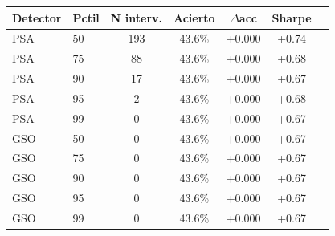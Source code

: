 \begin{tabular}{llccccc}
    \toprule
    Detector & Pctil & N interv. & Acierto & $\Delta$acc & Sharpe \\
    \midrule
        PSA & 50 & 193 & 43.6\% & +0.000 & +0.74 \\
        PSA & 75 & 88 & 43.6\% & +0.000 & +0.68 \\
        PSA & 90 & 17 & 43.6\% & +0.000 & +0.67 \\
        PSA & 95 & 2 & 43.6\% & +0.000 & +0.68 \\
        PSA & 99 & 0 & 43.6\% & +0.000 & +0.67 \\
        GSO & 50 & 0 & 43.6\% & +0.000 & +0.67 \\
        GSO & 75 & 0 & 43.6\% & +0.000 & +0.67 \\
        GSO & 90 & 0 & 43.6\% & +0.000 & +0.67 \\
        GSO & 95 & 0 & 43.6\% & +0.000 & +0.67 \\
        GSO & 99 & 0 & 43.6\% & +0.000 & +0.67 \\
    \bottomrule
\end{tabular}
